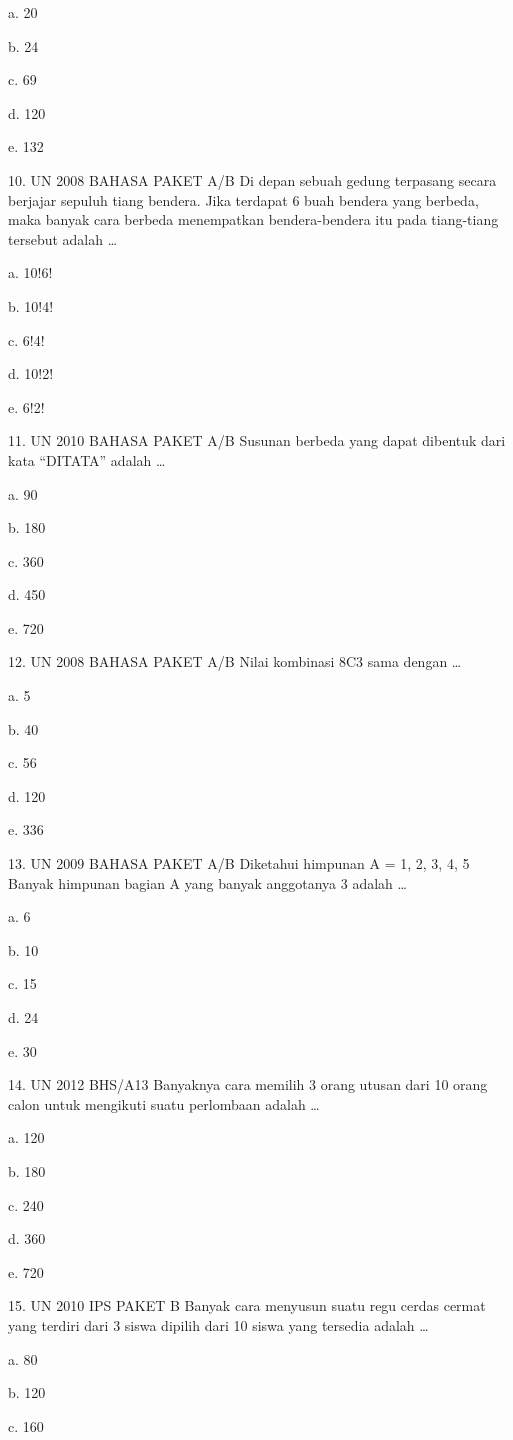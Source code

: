\documentclass[11pt,fleqn]{book} %
\begin{document}
a.	20

b.	24

c.	69

d.	120

e.	132

10.	UN 2008 BAHASA PAKET A/B 
Di depan sebuah gedung terpasang secara berjajar sepuluh tiang bendera. Jika terdapat 6 buah bendera yang berbeda, maka banyak cara berbeda menempatkan bendera-bendera itu pada tiang-tiang tersebut adalah …

a.	10!6!

b.	10!4!

c.	6!4!

d.	10!2!

e.	6!2!

11.	UN 2010 BAHASA PAKET A/B 
Susunan berbeda yang dapat dibentuk dari kata “DITATA” adalah …

a.	90

b.	180

c.	360

d.	450

e.	720

12.	UN 2008 BAHASA PAKET A/B 
Nilai kombinasi 8C3 sama dengan …

a.	5

b.	40

c.	56

d.	120

e.	336

13.	UN 2009 BAHASA PAKET A/B 
Diketahui himpunan A = {1, 2, 3, 4, 5} Banyak himpunan bagian A yang banyak anggotanya 3 adalah …

a.	6

b.	10

c.	15

d.	24

e.	30

14.	UN 2012 BHS/A13 
Banyaknya cara memilih 3 orang utusan dari 10 orang calon untuk mengikuti suatu perlombaan adalah …

a.	120

b.	180

c.	240

d.	360

e.	720

15.	UN 2010 IPS PAKET B 
Banyak cara menyusun suatu regu cerdas cermat yang terdiri dari 3 siswa dipilih dari 10 siswa yang tersedia adalah …

a.	80

b.	120

c.	160
\end{document}
